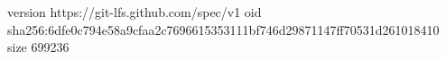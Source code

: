version https://git-lfs.github.com/spec/v1
oid sha256:6dfe0c794e58a9cfaa2c7696615353111bf746d29871147ff70531d261018410
size 699236
